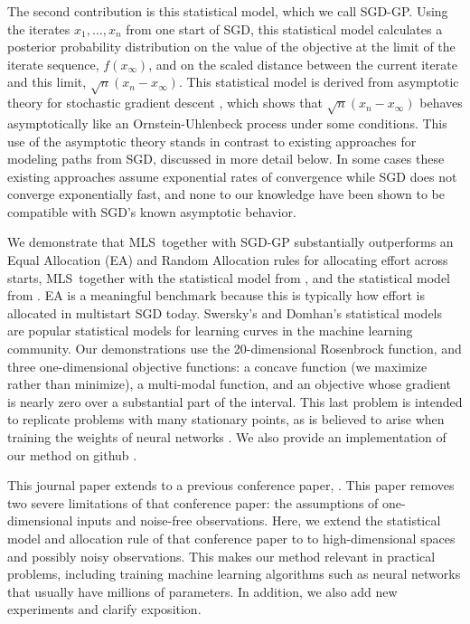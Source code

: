 \documentclass[12pt,english]{article}
\newcommand{\stedit}[1]{{\color{blue} #1}}
\newcommand{\abbrv}{MLS}
\begin{document}
The second contribution is this statistical model, which we call SGD-GP.  Using the iterates $x_1,\ldots,x_n$ from one start of SGD, this statistical model calculates a posterior probability distribution on the value of the objective at the limit of the iterate sequence, $f(x_\infty)$, and on the scaled distance between the current iterate and this limit, $\sqrt{n}(x_n - x_\infty)$.
This statistical model is derived from asymptotic theory for stochastic gradient descent \citep{kushner}, which shows 
that $\sqrt{n}(x_{n}-x_{\infty})$ behaves asymptotically like an Ornstein-Uhlenbeck process under some conditions.
This use of the asymptotic theory stands in contrast to existing approaches for modeling paths from SGD, discussed in more detail below. In some cases these existing approaches assume exponential rates of convergence \stedit{while SGD does not converge exponentially fast}, and none to our knowledge have been shown to be compatible with SGD's known asymptotic behavior.

We demonstrate that \abbrv\ together with SGD-GP substantially outperforms an Equal Allocation (EA) \stedit{and Random Allocation rules} for allocating effort across starts, \abbrv\ together with \stedit{the statistical model from \cite{Swersky:2014}}, and the statistical model from \cite{Hutter:2015}.  EA is a meaningful benchmark because this is typically how effort is allocated in multistart SGD today. \stedit{Swersky's and Domhan's statistical models are popular statistical models for learning curves in the machine learning community.}
Our demonstrations use \stedit{the 20-dimensional Rosenbrock function}, and three one-dimensional objective functions: a concave function (we maximize rather than minimize), a multi-modal function, and an objective whose gradient is nearly zero over a substantial part of the interval.  This last problem is intended to replicate problems with many stationary points, as is believed to arise when training the weights of neural networks
\citep{yoshua94}.
We also provide an implementation of our method on github \citep{MLS}.

\stedit{This journal paper extends to a previous conference paper, \cite{multi_start}. This paper removes two severe limitations of that conference paper: the assumptions of one-dimensional inputs and noise-free observations. Here, we extend the statistical model and allocation rule of that conference paper to to high-dimensional spaces and possibly noisy observations. This makes our method relevant in practical problems, including training machine learning algorithms such as neural networks that usually have millions of parameters. In addition, we also add new experiments and clarify exposition.}
\end{document}
